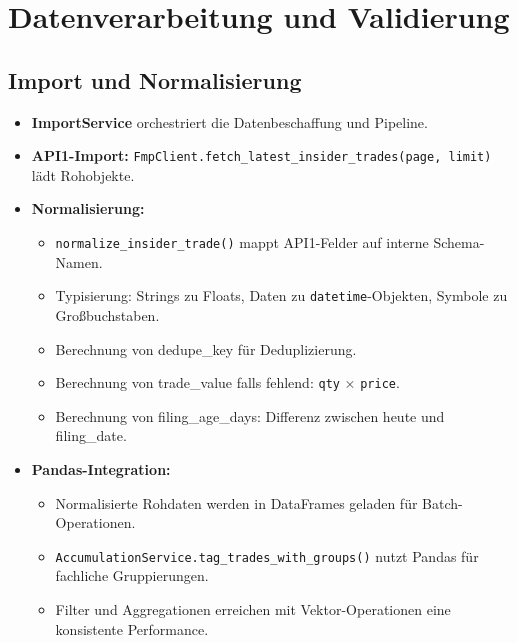 \section{Datenverarbeitung und Validierung}

\subsection{Import und Normalisierung}
\begin{itemize}
  \item \textbf{ImportService} orchestriert die Datenbeschaffung und Pipeline. %
  \item \textbf{API1-Import:} \texttt{FmpClient.fetch\_latest\_insider\_trades(page, limit)} lädt Rohobjekte. %
  \item \textbf{Normalisierung:}
    \begin{itemize}
      \item \texttt{normalize\_insider\_trade()} mappt API1-Felder auf interne Schema-Namen.
      \item Typisierung: Strings zu Floats, Daten zu \texttt{datetime}-Objekten, Symbole zu Großbuchstaben.
      \item Berechnung von dedupe\_key für Deduplizierung. %
      \item Berechnung von trade\_value falls fehlend: \texttt{qty} × \texttt{price}. %
      \item Berechnung von filing\_age\_days: Differenz zwischen heute und filing\_date. %
    \end{itemize}
  \item \textbf{Pandas-Integration:} %
    \begin{itemize}
      \item Normalisierte Rohdaten werden in DataFrames geladen für Batch-Operationen.
      \item \texttt{AccumulationService.tag\_trades\_with\_groups()} nutzt Pandas für fachliche Gruppierungen.
      \item Filter und Aggregationen erreichen mit Vektor-Operationen eine konsistente Performance.
    \end{itemize}
\end{itemize}

